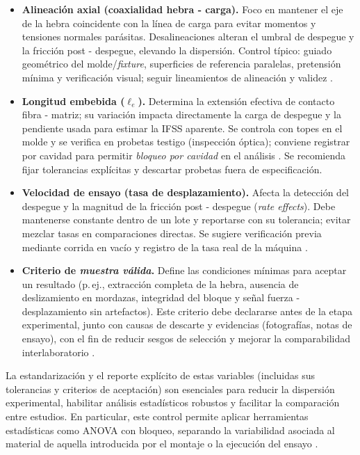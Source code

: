 \begin{itemize}
    \item \textbf{Alineación axial (coaxialidad hebra - carga).} 
    Foco en mantener el eje de la hebra coincidente con la línea de carga para evitar momentos y
    tensiones normales parásitas. Desalineaciones alteran el umbral de despegue y la fricción
    post - despegue, elevando la dispersión. Control típico: guiado geométrico del molde/\textit{fixture},
    superficies de referencia paralelas, pretensión mínima y verificación visual; seguir lineamientos de
    alineación y validez \cite{ISO19375,DINSPEC19289}.

    \item \textbf{Longitud embebida (\(\ell_e\)).} 
    Determina la extensión efectiva de contacto fibra - matriz; su variación impacta directamente la carga
    de despegue y la pendiente usada para estimar la IFSS aparente. Se controla con topes en el molde y
    se verifica en probetas testigo (inspección óptica); conviene registrar por cavidad para permitir
    \emph{bloqueo por cavidad} en el análisis \cite{DeLeon2022}. Se recomienda fijar tolerancias
    explícitas y descartar probetas fuera de especificación.

    \item \textbf{Velocidad de ensayo (tasa de desplazamiento).} 
    Afecta la detección del despegue y la magnitud de la fricción post - despegue (\emph{rate effects}).
    Debe mantenerse constante dentro de un lote y reportarse con su tolerancia; evitar mezclar tasas en
    comparaciones directas. Se sugiere verificación previa mediante corrida en vacío y registro de la
    tasa real de la máquina \cite{ISO19375,Fischer2020,Liu2021}.

    \item \textbf{Criterio de \emph{muestra válida}.} 
    Define las condiciones mínimas para aceptar un resultado (p.\,ej., extracción completa de la hebra,
    ausencia de deslizamiento en mordazas, integridad del bloque y señal fuerza - desplazamiento sin
    artefactos). Este criterio debe declararse antes de la etapa experimental, junto con causas de
    descarte y evidencias (fotografías, notas de ensayo), con el fin de reducir sesgos de selección y
    mejorar la comparabilidad interlaboratorio \cite{ISO19375,DINSPEC19289}.
\end{itemize}

\noindent
La estandarización y el reporte explícito de estas variables (incluidas sus tolerancias y criterios de
aceptación) son esenciales para reducir la dispersión experimental, habilitar análisis estadísticos
robustos y facilitar la comparación entre estudios. En particular, este control permite aplicar
herramientas estadísticas como ANOVA con bloqueo, separando la variabilidad asociada al material de
aquella introducida por el montaje o la ejecución del ensayo
\cite{ISO19375,DINSPEC19289,Fischer2020,Liu2021}.

